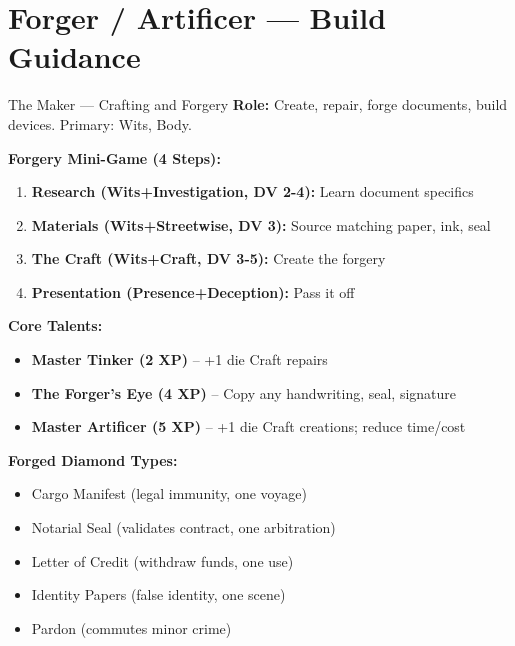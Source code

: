 \documentclass[10pt]{article}
\begin{document}
\newpage


\section*{Forger / Artificer --- Build Guidance}

\begin{tipbox}{The Maker --- Crafting and Forgery}
    \textbf{Role:} Create, repair, forge documents, build devices. Primary: Wits, Body.
    
    \textbf{Forgery Mini-Game (4 Steps):}
    \begin{enumerate}
        \item \textbf{Research (Wits+Investigation, DV 2-4):} Learn document specifics
        \item \textbf{Materials (Wits+Streetwise, DV 3):} Source matching paper, ink, seal
        \item \textbf{The Craft (Wits+Craft, DV 3-5):} Create the forgery
        \item \textbf{Presentation (Presence+Deception):} Pass it off
    \end{enumerate}
    
    \textbf{Core Talents:}
    \begin{itemize}
        \item \textbf{Master Tinker (2 XP)} -- +1 die Craft repairs
        \item \textbf{The Forger's Eye (4 XP)} -- Copy any handwriting, seal, signature
        \item \textbf{Master Artificer (5 XP)} -- +1 die Craft creations; reduce time/cost
    \end{itemize}
    
    \textbf{Forged Diamond Types:}
    \begin{itemize}
        \item Cargo Manifest (legal immunity, one voyage)
        \item Notarial Seal (validates contract, one arbitration)
        \item Letter of Credit (withdraw funds, one use)
        \item Identity Papers (false identity, one scene)
        \item Pardon (commutes minor crime)
    \end{itemize}
\end{tipbox}
\end{document}
